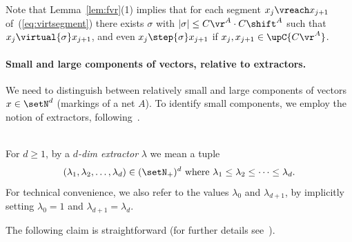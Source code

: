 \noindent
Note that Lemma~\ref{lem:fvr}(1) implies that for each segment $x_j\vreach x_{j+1}$
of~(\ref{eq:virtsegment}) there exists  $\sigma$ with
$|\sigma|\leq C\vr^A\cdot C\shift^A$ such that
$x_j\virtual{\sigma}x_{j+1}$,
and even $x_j\step{\sigma}x_{j+1}$ if $x_j,x_{j+1}\in\upC{C\vr^A}$.


\paragraph{Small and large components of vectors, relative to
extractors.}
We need to distinguish between relatively small and large components 
of vectors $x \in \setN^d$ (markings of a net $A$). 
To identify small components, we employ the notion of 
extractors, following~\cite{DBLP:conf/fsttcs/Leroux19}.


\begin{defi}\label{def:extract}
\hfill\\	
For $d\geq 1$, by a \emph{$d$-dim extractor} $\lambda$
we mean a tuple 
	\[(\lambda_1,\lambda_2,\dots,\lambda_d)\in(\setN_+)^d
	\text{ where }\lambda_1\leq\lambda_2 \leq \dots \leq
	\lambda_{d}.\]
For technical convenience, we also refer to the values $\lambda_0$
	and $\lambda_{d+1}$, by
implicitly setting $\lambda_0=1$ and $\lambda_{d+1}=\lambda_d$.
\end{defi}

\noindent
The following claim is straightforward (for further details
see~\cite{DBLP:conf/fsttcs/Leroux19}).

